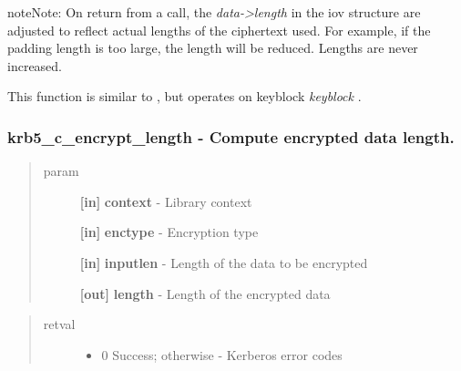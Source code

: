 \documentclass[letterpaper,10pt,english]{sphinxmanual}
\begin{document}


{\hyperref[appdev/refs/api/krb5_c_decrypt_iov:c.krb5_c_decrypt_iov]{}}



\begin{notice}{note}{Note:}
On return from a {\hyperref[appdev/refs/api/krb5_c_encrypt_iov:c.krb5_c_encrypt_iov]{}} call, the \emph{data-\textgreater{}length} in the iov structure are adjusted to reflect actual lengths of the ciphertext used. For example, if the padding length is too large, the length will be reduced. Lengths are never increased.

This function is similar to {\hyperref[appdev/refs/api/krb5_k_encrypt_iov:c.krb5_k_encrypt_iov]{}} , but operates on keyblock \emph{keyblock} .
\end{notice}


\subsubsection{krb5\_c\_encrypt\_length -  Compute encrypted data length.}
\label{appdev/refs/api/krb5_c_encrypt_length:krb5-c-encrypt-length-compute-encrypted-data-length}\label{appdev/refs/api/krb5_c_encrypt_length::doc}

\begin{fulllineitems}
\label{appdev/refs/api/krb5_c_encrypt_length:c.krb5_c_encrypt_length}
\end{fulllineitems}

\begin{quote}\begin{description}
\item[{param}] \leavevmode
\textbf{{[}in{]}} \textbf{context} - Library context

\textbf{{[}in{]}} \textbf{enctype} - Encryption type

\textbf{{[}in{]}} \textbf{inputlen} - Length of the data to be encrypted

\textbf{{[}out{]}} \textbf{length} - Length of the encrypted data

\end{description}\end{quote}
\begin{quote}\begin{description}
\item[{retval}] \leavevmode\begin{itemize}
\item {} 
0   Success; otherwise - Kerberos error codes

\end{itemize}

\end{description}\end{quote}
\end{document}
